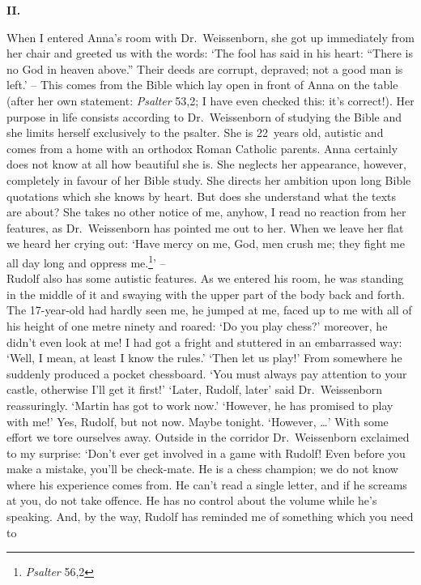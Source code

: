 \begin {center} 
{\bf II.} 
\end {center} 
When I entered Anna's room with Dr.~Weissenborn, she got up immediately from her 
chair and greeted us with the words: `The fool has said in his heart: ``There is no 
God in heaven above.'' Their deeds are corrupt, depraved; not a good man is left.'
-- This comes from the Bible which lay open in front of Anna on the table (after her 
own statement: {\em Psalter\/} 53,2; I have even checked this: it's correct!). 
Her purpose in life consists according to Dr.~Weissenborn of studying the Bible 
and she limits herself exclusively to the psalter. 
She is 22~years old, autistic and comes from a home with an orthodox Roman Catholic parents. 
Anna certainly does not know at all how beautiful she is. 
She neglects her appearance, however, completely in favour of her Bible study. 
She directs her ambition upon long Bible quotations which she knows by heart. 
But does she understand what the texts are about? 
She takes no other notice of me, anyhow, I read no reaction from her features, as Dr.~Weissenborn has pointed me out to her. 
When we leave her flat we heard her crying out: `Have mercy on me, God, men crush me; they 
fight me all day long and oppress me.\footnote {{\em Psalter\/} 56,2}' -- \\ 
Rudolf also has some autistic features. 
As we entered his room, he was standing in the middle of it and swaying with the 
upper part of the body back and forth. 
The 17-year-old had hardly seen me, he jumped at me, faced up to me with all of 
his height of one metre ninety and roared: `Do you play chess?' moreover, he didn't even look at me! 
I had got a fright and stuttered in an embarrassed way: 
`Well, I mean, at least I know the rules.' `Then let us play!' 
From somewhere he suddenly produced a pocket chessboard. 
`You must always pay attention to your castle, otherwise I'll get it first!' 
`Later, Rudolf, later' said Dr.~Weissenborn reassuringly. `Martin has got to work now.'
`However, he has promised to play with me!' Yes, Rudolf, but not now. 
Maybe tonight. `However, \dots' With some effort we tore ourselves away. 
Outside in the corridor Dr.~Weissenborn exclaimed to my surprise: `Don't ever get 
involved in a game with Rudolf! Even before you make a mistake, you'll be check-mate. 
He is a chess champion; we do not know where his experience comes from. 
He can't read a single letter, and if he screams at you, do not take offence. 
He has no control about the volume while he's speaking. 
And, by the way, Rudolf has reminded me of something which you need to 
